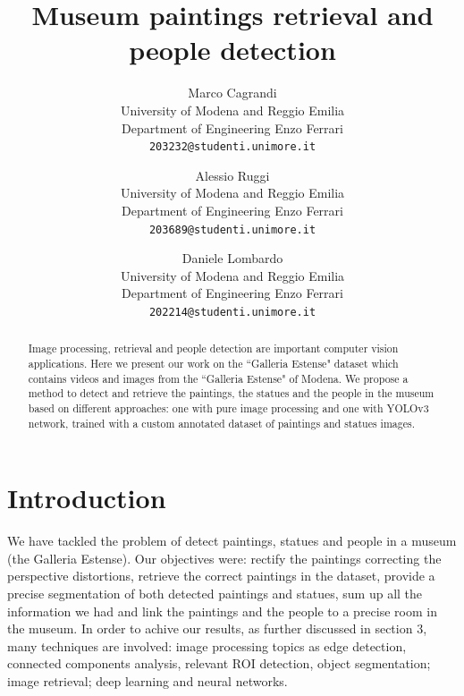 \documentclass[10pt,twocolumn,letterpaper]{article}
\begin{document}
\title{Museum paintings retrieval and people detection}

\author{Marco Cagrandi\\
University of Modena and Reggio Emilia\\
Department of Engineering Enzo Ferrari\\
{\tt\small 203232@studenti.unimore.it}
\and
Alessio Ruggi\\
University of Modena and Reggio Emilia\\
Department of Engineering Enzo Ferrari\\
{\tt\small 203689@studenti.unimore.it}
\and
Daniele Lombardo\\
University of Modena and Reggio Emilia\\
Department of Engineering Enzo Ferrari\\
{\tt\small 202214@studenti.unimore.it}
}


\maketitle

\begin{abstract}
   Image processing, retrieval and people detection
   are important computer vision applications.
   Here we present our work on the ``Galleria Estense" dataset which contains
   videos and images from the ``Galleria Estense" of Modena.
   We propose a method to detect and retrieve the paintings, the statues and the people in the 
   museum based on different approaches: one with pure image processing and one 
   with YOLOv3 network, trained with a custom annotated dataset of paintings and statues 
   images. 
\end{abstract}

\section{Introduction}

We have tackled the problem of detect paintings, statues and people in a museum (the Galleria Estense).
Our objectives were: rectify the paintings correcting the perspective distortions, retrieve the correct paintings in the dataset, provide a precise segmentation of both detected paintings and statues, sum up all the information we had and link the paintings and the people to a precise room in the museum.
 In order to achive our results, as further discussed in section 3, many techniques are involved: image processing topics as edge detection, connected components analysis, relevant ROI detection, object segmentation; image retrieval; deep learning and neural networks. 
\end{document}
